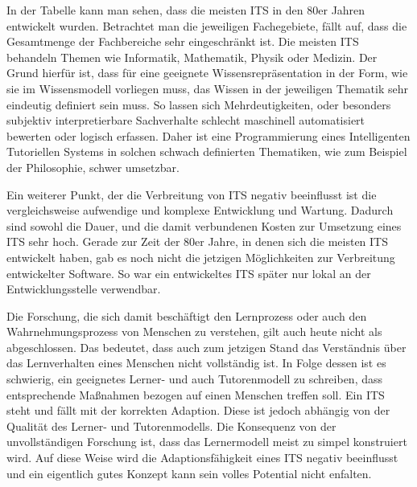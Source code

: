 In der Tabelle kann man sehen, dass die meisten ITS in den 80er Jahren entwickelt wurden.
Betrachtet man die jeweiligen Fachegebiete, fällt auf, dass die Gesamtmenge der Fachbereiche
sehr eingeschränkt ist. Die meisten ITS behandeln Themen wie Informatik, Mathematik, Physik
oder Medizin. Der Grund hierfür ist, dass für eine geeignete Wissensrepräsentation in der Form,
wie sie im Wissensmodell vorliegen muss, das Wissen in der jeweiligen Thematik sehr eindeutig
definiert sein muss. So lassen sich Mehrdeutigkeiten, oder besonders subjektiv interpretierbare
Sachverhalte schlecht maschinell automatisiert bewerten oder logisch erfassen. Daher ist eine Programmierung
eines Intelligenten Tutoriellen Systems in solchen schwach definierten Thematiken, wie zum Beispiel
der Philosophie, schwer umsetzbar.

Ein weiterer Punkt, der die Verbreitung von ITS negativ beeinflusst ist die vergleichsweise
aufwendige und komplexe Entwicklung und Wartung. Dadurch sind sowohl die Dauer, und die
damit verbundenen Kosten zur Umsetzung eines ITS sehr hoch. Gerade zur Zeit der 80er Jahre,
in denen sich die meisten ITS entwickelt haben, gab es noch nicht die jetzigen Möglichkeiten zur
Verbreitung entwickelter Software. So war ein entwickeltes ITS später nur lokal an der Entwicklungsstelle
verwendbar.

Die Forschung, die sich damit beschäftigt den Lernprozess oder auch den Wahrnehmungsprozess von
Menschen zu verstehen, gilt auch heute nicht als abgeschlossen. Das bedeutet, dass auch zum jetzigen Stand
das Verständnis über das Lernverhalten eines Menschen nicht vollständig ist.
In Folge dessen ist es schwierig, ein geeignetes Lerner- und auch Tutorenmodell zu schreiben,
dass entsprechende Maßnahmen bezogen auf einen Menschen treffen soll. Ein ITS steht und fällt mit der
korrekten Adaption. Diese ist jedoch abhängig von der Qualität des Lerner- und Tutorenmodells.
Die Konsequenz von der unvollständigen Forschung ist, dass das Lernermodell meist zu simpel konstruiert wird.
Auf diese Weise wird die Adaptionsfähigkeit eines ITS negativ beeinflusst und ein eigentlich gutes Konzept
kann sein volles Potential nicht enfalten.

